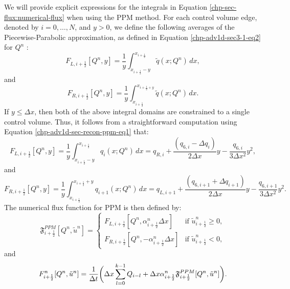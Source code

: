 We will provide explicit expressions for the integrals in Equation \eqref{chp-sec-flux:numerical-flux} 
when using the PPM method. For each control volume edge, denoted by $i=0, \ldots, N$, and $y>0$, 
we define the following averages of the Piecewise-Parabolic approximation, as defined in
Equation \eqref{chp-adv1d-sec3-1-eq2} for $Q^{n}$ \citep{colella:1984}:
\begin{equation}
	\label{chp-sec-flux:fL_1}
	F_{L,i+\frac{1}{2}}[Q^n,y] = \frac{1}{y} \int_{x_{i+\frac{1}{2}}-y}^{x_{i+\frac{1}{2}}}
	\tilde{q}(x;Q^n)\,dx,
\end{equation}
and
\begin{equation}
	\label{chp-sec-flux:fR_1}
	F_{R,i+\frac{1}{2}}[Q^n,y] = \frac{1}{y} \int_{x_{i+\frac{1}{2}}}^{x_{i+\frac{1}{2}+y}}
	\tilde{q}(x;Q^n)\,dx.
\end{equation}
If $y \leq \Delta x$, then both of the above integral domains
are constrained to a single control volume. Thus,
it follows from a straightforward computation using 
Equation \eqref{chp-adv1d-sec-recon-ppm-eq1} that:
\begin{equation}
	\label{chp-sec-flux:fL_2}
	F_{L,i+\frac{1}{2}}[Q^n,y] = \frac{1}{y} \int_{x_{i+\frac{1}{2}}-y}^{x_{i+\frac{1}{2}}}
	q_{i}(x;Q^n)\,dx = 
	q_{R,i} +\frac{(q_{6,i} - \Delta q_i)}{2\Delta x}y
	- \frac{q_{6,i}}{3\Delta x^2}y^2,
\end{equation}
and
\begin{equation}
	\label{chp-sec-flux:fR_2}
	F_{R,i+\frac{1}{2}}[Q^n,y] = \frac{1}{y} \int_{x_{i+\frac{1}{2}}}^{x_{i+\frac{1}{2}}+y}
	q_{i+1}(x;Q^n)\,dx = 
	q_{L,i+1} +\frac{(q_{6,i+1} + \Delta q_{i+1})}{2\Delta x}y
	- \frac{q_{6,i+1}}{3\Delta x^2}y^2.
\end{equation}
The numerical flux function for PPM is then defined by:
\begin{equation}
	\label{chp-sec-flux:numerical-flux2}
        \mathfrak{F}_{i+\frac{1}{2}}^{PPM}[Q^n,\tilde{u}^n] =
    	\begin{cases} F_{L,i+\frac{1}{2}}[Q^n, {\alpha}_{i+\frac{1}{2}}^n\Delta x] & \text{if } \tilde{u}_{i+\frac{1}{2}}^n \geq 0,\\
		      F_{R,i+\frac{1}{2}}[Q^n,-{\alpha}_{i+\frac{1}{2}}^n\Delta x] & \text{if } \tilde{u}_{i+\frac{1}{2}}^n<0,
    	\end{cases}
\end{equation}
and
\begin{equation}
	\label{chp-sec-flux:numerical-flux3}
         {F}_{i+\frac{1}{2}}^n[Q^n,\tilde{u}^n]  =  \frac{1}{\Delta t} \bigg(
    	\Delta x\sum_{l=0}^{k-1} Q_{i-l} +  
        \Delta x {\alpha}_{i+\frac{1}{2}}^n\mathfrak{F}_{i+\frac{1}{2}}^{PPM}[Q^n,\tilde{u}^n]\bigg).\\
\end{equation}
